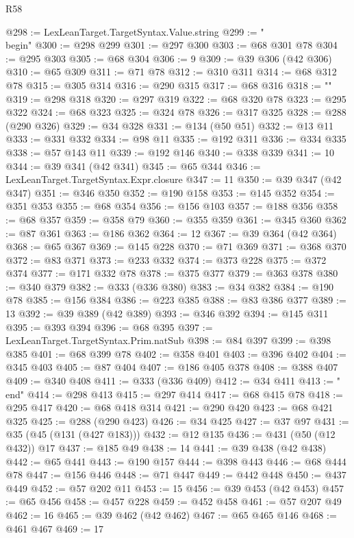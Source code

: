 \begin{lexlean}{R58}
\begin{coremodule}
@298 := LexLeanTarget.TargetSyntax.Value.string
@299 := "\\begin{"
@300 := @298 @299
@301 := @297 @300
@303 := @68 @301 @78
@304 := @295 @303
@305 := @68 @304
@306 := 9
@309 := @39 @306 (@42 @306)
@310 := @65 @309
@311 := @71 @78
@312 := @310 @311
@314 := @68 @312 @78
@315 := @305 @314
@316 := @290 @315
@317 := @68 @316
@318 := "}"
@319 := @298 @318
@320 := @297 @319
@322 := @68 @320 @78
@323 := @295 @322
@324 := @68 @323
@325 := @324 @78
@326 := @317 @325
@328 := @288 (@290 @326)
@329 := @34 @328
@331 := @134 (@50 @51)
@332 := @13 @11
@333 := @331 @332
@334 := @98 @11
@335 := @192 @311
@336 := @334 @335
@338 := @57 @143 @11
@339 := @192 @146
@340 := @338 @339
@341 := 10
@344 := @39 @341 (@42 @341)
@345 := @65 @344
@346 := LexLeanTarget.TargetSyntax.Expr.closure
@347 := 11
@350 := @39 @347 (@42 @347)
@351 := @346 @350
@352 := @190 @158
@353 := @145 @352
@354 := @351 @353
@355 := @68 @354
@356 := @156 @103
@357 := @188 @356
@358 := @68 @357
@359 := @358 @79
@360 := @355 @359
@361 := @345 @360
@362 := @87 @361
@363 := @186 @362
@364 := 12
@367 := @39 @364 (@42 @364)
@368 := @65 @367
@369 := @145 @228
@370 := @71 @369
@371 := @368 @370
@372 := @83 @371
@373 := @233 @332
@374 := @373 @228
@375 := @372 @374
@377 := @171 @332 @78
@378 := @375 @377
@379 := @363 @378
@380 := @340 @379
@382 := @333 (@336 @380)
@383 := @34 @382
@384 := @190 @78
@385 := @156 @384
@386 := @223 @385
@388 := @83 @386 @377
@389 := 13
@392 := @39 @389 (@42 @389)
@393 := @346 @392
@394 := @145 @311
@395 := @393 @394
@396 := @68 @395
@397 := LexLeanTarget.TargetSyntax.Prim.natSub
@398 := @84 @397
@399 := @398 @385
@401 := @68 @399 @78
@402 := @358 @401
@403 := @396 @402
@404 := @345 @403
@405 := @87 @404
@407 := @186 @405 @378
@408 := @388 @407
@409 := @340 @408
@411 := @333 (@336 @409)
@412 := @34 @411
@413 := "\\end{"
@414 := @298 @413
@415 := @297 @414
@417 := @68 @415 @78
@418 := @295 @417
@420 := @68 @418 @314
@421 := @290 @420
@423 := @68 @421 @325
@425 := @288 (@290 @423)
@426 := @34 @425
@427 := @37 @97
@431 := @35 (@45 (@131 (@427 @183)))
@432 := @12 @135
@436 := @431 (@50 (@12 @432)) @17
@437 := @185 @49
@438 := 14
@441 := @39 @438 (@42 @438)
@442 := @65 @441
@443 := @190 @157
@444 := @398 @443
@446 := @68 @444 @78
@447 := @156 @446
@448 := @71 @447
@449 := @442 @448
@450 := @437 @449
@452 := @57 @202 @11
@453 := 15
@456 := @39 @453 (@42 @453)
@457 := @65 @456
@458 := @457 @228
@459 := @452 @458
@461 := @57 @207 @49
@462 := 16
@465 := @39 @462 (@42 @462)
@467 := @65 @465 @146
@468 := @461 @467
@469 := 17
}
\end{coremodule}
\end{lexlean}
